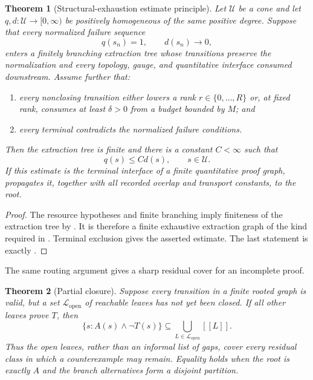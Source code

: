 \documentclass[11pt,reqno]{amsart}
\theoremstyle{plain}
\newtheorem{theorem}{Theorem}[section]
\theoremstyle{definition}
\theoremstyle{remark}
\numberwithin{equation}{section}
\newcommand{\calL}{\mathcal L}
\newcommand{\calU}{\mathcal U}
\newcommand{\sem}[1]{[\![#1]\!]}
\begin{document}
\begin{theorem}[Structural-exhaustion estimate principle]
\label{thm:structural-exhaustion-estimate}
Let \(\calU\) be a cone and let
\(q,d:\calU\to[0,\infty)\) be positively homogeneous of the same positive
degree.  Suppose that every normalized failure sequence
\[
 q(s_n)=1,\qquad d(s_n)\to0,
\]
enters a finitely branching extraction tree whose transitions preserve the
normalization and every topology, gauge, and quantitative interface consumed
downstream.  Assume further that:
\begin{enumerate}
  \item every nonclosing transition either lowers a rank
  \(r\in\{0,\ldots,R\}\) or, at fixed rank, consumes at least
  \(\delta>0\) from a budget bounded by \(M\); and
  \item every terminal contradicts the normalized failure conditions.
\end{enumerate}
Then the extraction tree is finite and there is a constant \(C<\infty\) such
that
\[
 q(s)\le C d(s),\qquad s\in\calU.
\]
If this estimate is the terminal interface of a finite quantitative proof
graph,  propagates it, together with all recorded
overlap and transport constants, to the root.
\end{theorem}

\begin{proof}
The resource hypotheses and finite branching imply finiteness of the extraction
tree by .  It is therefore a finite exhaustive
extraction graph of the kind required in
.  Terminal exclusion gives the asserted
estimate.  The last statement is exactly
.
\end{proof}

The same routing argument gives a sharp residual cover for an incomplete proof.

\begin{theorem}[Partial closure]\label{thm:partial}
Suppose every transition in a finite rooted graph is valid, but a set
\(\calL_{\mathrm{open}}\) of reachable leaves has not yet been closed.  If all
other leaves prove \(T\), then
\begin{equation}\label{eq:partial}
  \{s:A(s)\wedge\neg T(s)\}
  \subseteq
  \bigcup_{L\in\calL_{\mathrm{open}}}\sem L.
\end{equation}
Thus the open leaves, rather than an informal list of gaps, cover every
residual class in which a counterexample may remain.  Equality holds when the
root is exactly \(A\) and the branch alternatives form a disjoint partition.
\end{theorem}
\end{document}
